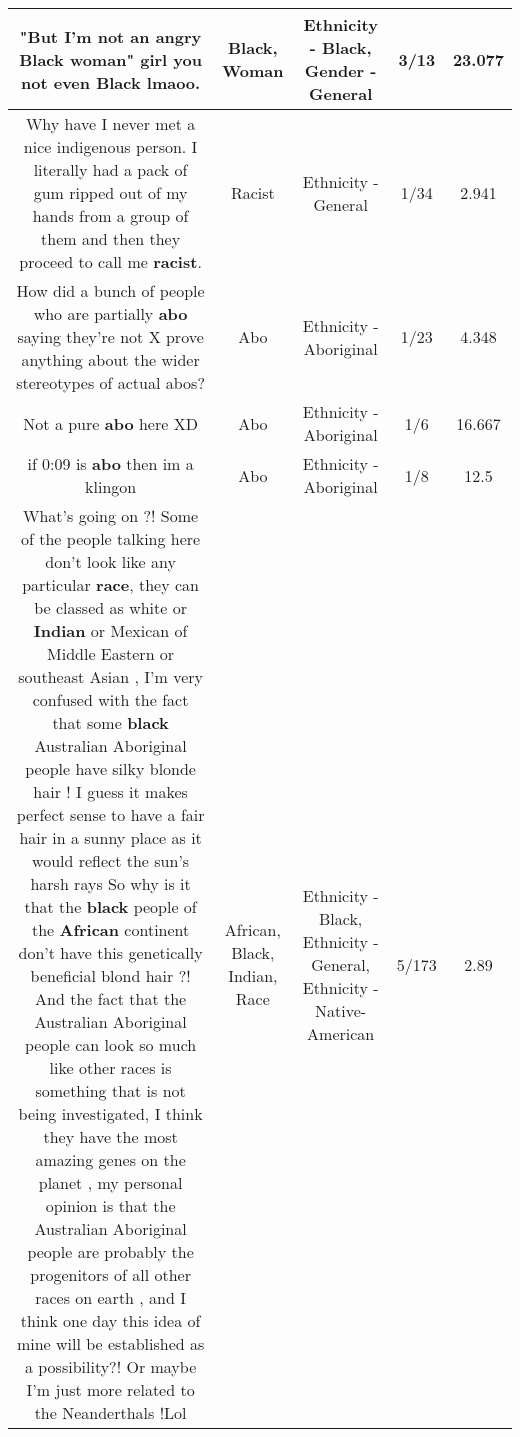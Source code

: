 \documentclass[11pt]{article}
\newlength\mylength
\begin{document}
\begin{center}
\begin{longtable}{|C{.65\mylength}|C{.30\mylength}|C{.12\mylength}|C{.12\mylength}|C{.12\mylength}|}
  \small "But I'm not an angry \textbf{Black} \textbf{woman}" girl you not even \textbf{Black} lmaoo.\normalsize   & Black, Woman & Ethnicity - Black, Gender - General & 3/13 & 23.077 \\  \hline
  \small Why have I never met a nice indigenous person. I literally had a pack of gum ripped out of my hands from a group of them and then they proceed to call me \textbf{racist}.\normalsize   & Racist & Ethnicity - General & 1/34 & 2.941 \\  \hline
  \small How did a bunch of people who are partially \textbf{abo} saying they're not X prove anything about the wider stereotypes of actual abos?\normalsize   & Abo & Ethnicity - Aboriginal & 1/23 & 4.348 \\  \hline
  \small Not a pure \textbf{abo} here XD\normalsize   & Abo & Ethnicity - Aboriginal & 1/6 & 16.667 \\  \hline
  \small if 0:09 is \textbf{abo} then im a klingon\normalsize   & Abo & Ethnicity - Aboriginal & 1/8 & 12.5 \\  \hline
  \small What's going on ?! Some of the people talking here don't look like any particular \textbf{race}, they can be classed as white or \textbf{Indian} or Mexican of Middle Eastern or southeast Asian , I'm very confused with the fact that some \textbf{black} Australian Aboriginal people have silky blonde hair  ! I guess it makes perfect sense to have a fair hair in a sunny place as it would reflect the sun's harsh rays So why is it that the \textbf{black} people of the \textbf{African} continent don't have this genetically beneficial blond hair ?! And the fact that the Australian Aboriginal people can look so much like other races is something that is not being investigated, I think they have the most amazing genes on the planet , my personal opinion is that the  Australian Aboriginal people are probably the progenitors of all other races on earth , and I think one day this idea of mine will be established as a possibility?! Or maybe I'm just more related to the Neanderthals !Lol\normalsize   & African, Black, Indian, Race & Ethnicity - Black, Ethnicity - General, Ethnicity - Native-American & 5/173 & 2.89 \\  \hline

\end{longtable}
\end{center}
\end{document}
